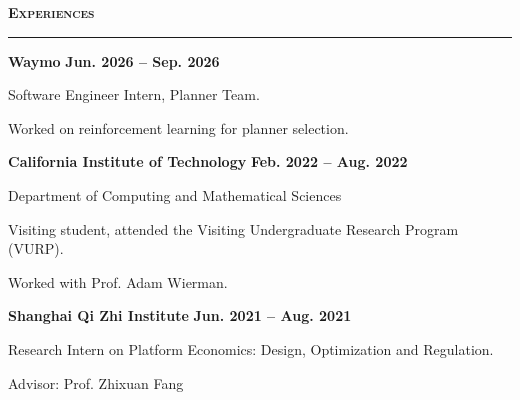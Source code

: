 \documentclass[11pt]{article}
\newcommand{\Section}[1]{%
  \vspace{0.9\baselineskip}%
  {\large\bfseries\scshape #1}\\[-0.35\baselineskip]
  \rule{\linewidth}{0.4pt}\vspace{0.35\baselineskip}%
}
\begin{document}
\Section{Experiences}
{\bf Waymo} {\hfill \bf Jun. 2026 -- Sep. 2026}
\begin{list2}
\item[] Software Engineer Intern, Planner Team.
\item[] Worked on reinforcement learning for planner selection.
\end{list2}

{\bf California Institute of Technology} {\hfill \bf Feb. 2022 -- Aug. 2022}
\begin{list2}
\item[] Department of Computing and Mathematical Sciences
\item[] Visiting student, attended the Visiting Undergraduate Research Program (VURP).
\item[] Worked with Prof. Adam Wierman.
\end{list2}

{\bf Shanghai Qi Zhi Institute} {\hfill \bf Jun. 2021 -- Aug. 2021}
\begin{list2}
\item[] Research Intern on Platform Economics: Design, Optimization and Regulation.
\item[] Advisor: Prof. Zhixuan Fang
\end{list2}
\end{document}
